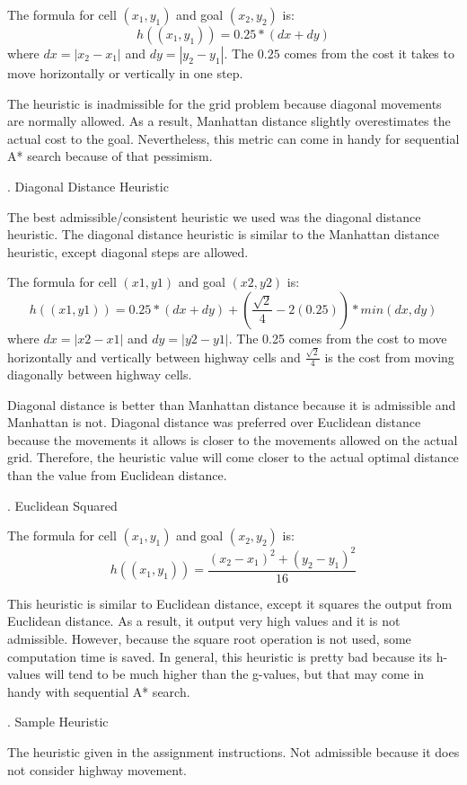 \documentclass[12pt, letterpaper]{article}
\begin{document}
The formula for cell $(x_1, y_1)$ and goal $(x_2, y_2)$ is:
$$h((x_1, y_1)) = 0.25 * (dx + dy)$$
where $dx = |x_2 - x_1|$ and $dy = |y_2 - y_1|$. The $0.25$ comes from the cost it takes to move horizontally or vertically in one step.

The heuristic is inadmissible for the grid problem because diagonal movements are normally allowed. As a result, Manhattan distance slightly overestimates the actual cost to the goal. Nevertheless, this metric can come in handy for sequential A* search because of that pessimism.

\bigskip
{}. Diagonal Distance Heuristic

The best admissible/consistent heuristic we used was the diagonal distance heuristic. The diagonal distance heuristic is similar to the Manhattan distance heuristic, except diagonal steps are allowed. 

The formula for cell $(x1,y1)$ and goal $(x2, y2)$ is:
$$h((x1, y1)) = 0.25 * (dx + dy) +  (\frac{\sqrt{2}}{4} - 2(0.25)) * min(dx, dy)$$
where $dx = |x2 - x1|$ and $dy = |y2 - y1|$. The 0.25 comes from the cost to move horizontally and vertically between highway cells and $\frac{\sqrt{2}}{4}$ is the cost from moving diagonally between highway cells.

Diagonal distance is better than Manhattan distance because it is admissible and Manhattan is not. Diagonal distance was preferred over Euclidean distance because the movements it allows is closer to the movements allowed on the actual grid. Therefore, the heuristic value will come closer to the actual optimal distance than the value from Euclidean distance.

\bigskip
{}. Euclidean Squared

The formula for cell $(x_1, y_1)$ and goal $(x_2, y_2)$ is:
$$h((x_1,y_1)) = \frac{(x_2-x_1)^2 + (y_2-y_1)^2}{16}$$

This heuristic is similar to Euclidean distance, except it squares the output from Euclidean distance. As a result, it output very high values and it is not admissible. However, because the square root operation is not used, some computation time is saved. In general, this heuristic is pretty bad because its h-values will tend to be much higher than the g-values, but that may come in handy with sequential A* search.

\bigskip
{}. Sample Heuristic

The heuristic given in the assignment instructions. Not admissible because it does not consider highway movement.
\end{document}
